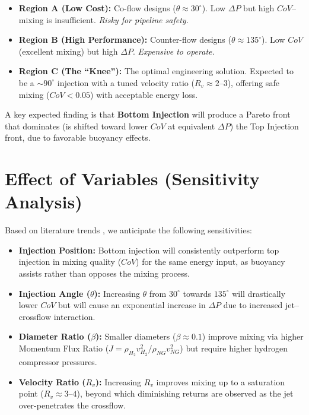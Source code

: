 \documentclass[12pt, a4paper]{report}
\begin{document}
\begin{itemize}
    \item \textbf{Region A (Low Cost):} Co-flow designs ($\theta \approx 30^\circ$). Low $\Delta P$ but high $CoV$--mixing is insufficient. \textit{Risky for pipeline safety.}
    \item \textbf{Region B (High Performance):} Counter-flow designs ($\theta \approx 135^\circ$). Low $CoV$ (excellent mixing) but high $\Delta P$. \textit{Expensive to operate.}
    \item \textbf{Region C (The ``Knee''):} The optimal engineering solution. Expected to be a $\sim 90^\circ$ injection with a tuned velocity ratio ($R_v \approx 2$--$3$), offering safe mixing ($CoV < 0.05$) with acceptable energy loss.
\end{itemize}

\noindent A key expected finding is that \textbf{Bottom Injection} will produce a Pareto front that dominates (is shifted toward lower $CoV$ at equivalent $\Delta P$) the Top Injection front, due to favorable buoyancy effects.

\section{Effect of Variables (Sensitivity Analysis)}
Based on literature trends \cite{Su2022, Arya2023}, we anticipate the following sensitivities:
\begin{itemize}
    \item \textbf{Injection Position:} Bottom injection will consistently outperform top injection in mixing quality ($CoV$) for the same energy input, as buoyancy assists rather than opposes the mixing process.
    \item \textbf{Injection Angle ($\theta$):} Increasing $\theta$ from $30^\circ$ towards $135^\circ$ will drastically lower $CoV$ but will cause an exponential increase in $\Delta P$ due to increased jet--crossflow interaction.
    \item \textbf{Diameter Ratio ($\beta$):} Smaller diameters ($\beta \approx 0.1$) improve mixing via higher Momentum Flux Ratio ($J = \rho_{H_2} v_{H_2}^2 / \rho_{NG} v_{NG}^2$) but require higher hydrogen compressor pressures.
    \item \textbf{Velocity Ratio ($R_v$):} Increasing $R_v$ improves mixing up to a saturation point ($R_v \approx 3$--$4$), beyond which diminishing returns are observed as the jet over-penetrates the crossflow.
\end{itemize}
\end{document}

